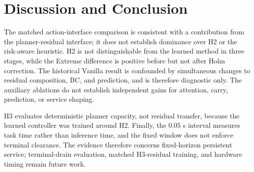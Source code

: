 \documentclass[conference]{IEEEtran}
\begin{document}
\section{Discussion and Conclusion}
The matched action-interface comparison is consistent with a contribution from
the planner-residual interface; it does not establish dominance over H2 or
the risk-aware heuristic. H2 is not distinguishable from the learned method
in three stages, while the
Extreme difference is positive before but not after Holm correction. The
historical Vanilla result is confounded by simultaneous changes to residual
composition, BC, and prediction, and is therefore diagnostic only. The
auxiliary ablations do not establish independent gains for attention, carry,
prediction, or service shaping.

H3 evaluates deterministic planner capacity, not residual transfer, because
the learned controller was trained around H2. Finally, the $0.05$ s interval
measures task time rather than inference time, and the fixed window does not
enforce terminal clearance. The evidence therefore concerns fixed-horizon
persistent service; terminal-drain evaluation, matched H3-residual training,
and hardware timing remain future work.

\begingroup
\renewcommand{\footnotesize}{\tiny}
\makeatletter
\def\IEEEbibitemsep{-1pt}
\makeatother


\endgroup
\end{document}
